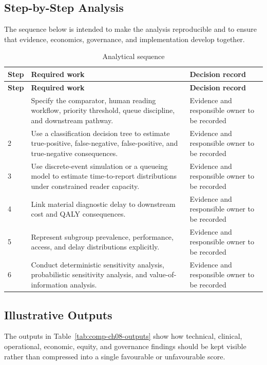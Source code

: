 \subsection{Step-by-Step Analysis}
The sequence below is intended to make the analysis reproducible and to ensure
that evidence, economics, governance, and implementation develop together.

\begin{longtable}{@{}p{}p{}p{}@{}}
\caption{Analytical sequence}
\label{tab:comp-ch08-analysis-steps}\\
\toprule
\textbf{Step} & \textbf{Required work} & \textbf{Decision record} \\
\midrule
\endfirsthead
\toprule
\textbf{Step} & \textbf{Required work} & \textbf{Decision record} \\
\midrule
\endhead
\bottomrule
\endlastfoot
1 & Specify the comparator, human reading workflow, priority threshold, queue discipline, and downstream pathway. & Evidence and responsible owner to be recorded \\
2 & Use a classification decision tree to estimate true-positive, false-negative, false-positive, and true-negative consequences. & Evidence and responsible owner to be recorded \\
3 & Use discrete-event simulation or a queueing model to estimate time-to-report distributions under constrained reader capacity. & Evidence and responsible owner to be recorded \\
4 & Link material diagnostic delay to downstream cost and QALY consequences. & Evidence and responsible owner to be recorded \\
5 & Represent subgroup prevalence, performance, access, and delay distributions explicitly. & Evidence and responsible owner to be recorded \\
6 & Conduct deterministic sensitivity analysis, probabilistic sensitivity analysis, and value-of-information analysis. & Evidence and responsible owner to be recorded \\
\end{longtable}

\subsection{Illustrative Outputs}
The outputs in Table~\ref{tab:comp-ch08-outputs} show how technical,
clinical, operational, economic, equity, and governance findings should be kept
visible rather than compressed into a single favourable or unfavourable score.

